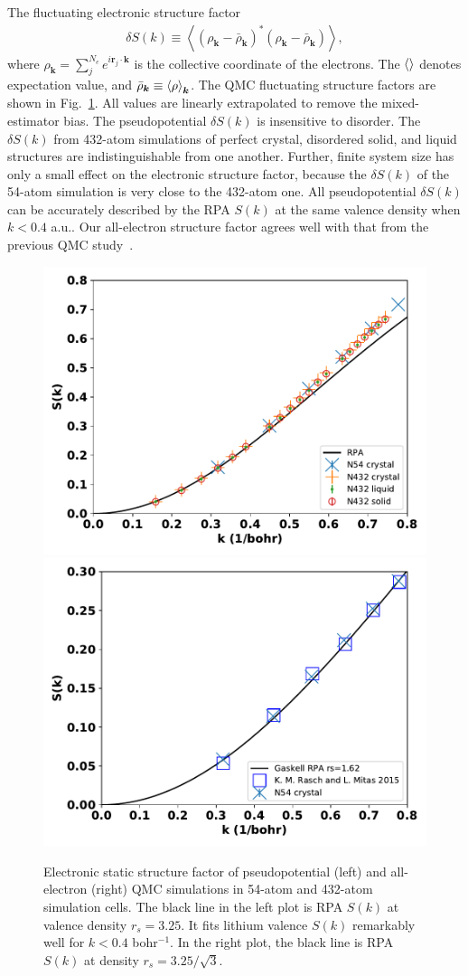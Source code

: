 \documentclass[aps,prl,superscriptaddress]{revtex4-1}
\newcommand{\bs}{\boldsymbol}
\begin{document}
The fluctuating electronic structure factor
\begin{align}
\delta S(k) \equiv \left\langle
(\rho_{\bs{k}}-\bar{\rho}_{\bs{k}})^* (\rho_{\bs{k}}-\bar{\rho}_{\bs{k}})
\right\rangle,
\end{align}
where $\rho_{\bs{k}} = \sum\limits_j^{N_e} e^{i\bs{r}_j\cdot\bs{k}}$ is the collective coordinate of the electrons. The $\braket{}$ denotes expectation value, and $\bar{\rho}_{\bs{k}}\equiv\braket{\rho}_{\bs{k}}$. The QMC fluctuating structure factors are shown in Fig.~\ref{fig:qmc-dsk}. All values are linearly extrapolated to remove the mixed-estimator bias. The pseudopotential $\delta S(k)$ is insensitive to disorder. The $\delta S(k)$ from 432-atom simulations of perfect crystal, disordered solid, and liquid structures are indistinguishable from one another. Further, finite system size has only a small effect on the electronic structure factor, because the $\delta S(k)$ of the 54-atom simulation is very close to the 432-atom one. All pseudopotential $\delta S(k)$ can be accurately described by the RPA $S(k)$ at the same valence density when $k<0.4$ a.u.. Our all-electron structure factor agrees well with that from the previous QMC study~\cite{Rasch2015}.

\begin{figure}[h]
\includegraphics[width=0.48\linewidth]{li40bg_dsk-bfd}
\includegraphics[width=0.48\linewidth]{li40bg_dsk-fc}
\caption{Electronic static structure factor of pseudopotential (left) and all-electron (right) QMC simulations in 54-atom and 432-atom simulation cells. The black line in the left plot is RPA $S(k)$ at valence density $r_s=3.25$. It fits lithium valence $S(k)$ remarkably well for $k<0.4$ bohr$^{-1}$. In the right plot, the black line is RPA $S(k)$ at density $r_s=3.25/\sqrt{3}$. \label{fig:qmc-dsk}}
\end{figure}
\end{document}
